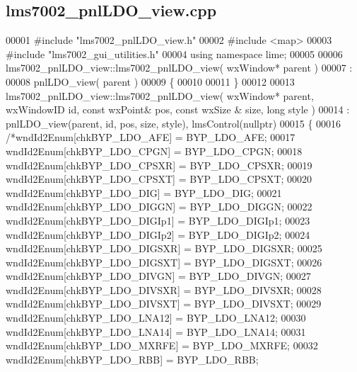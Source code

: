 \subsection{lms7002\+\_\+pnl\+L\+D\+O\+\_\+view.\+cpp}
\label{lms7002__pnlLDO__view_8cpp_source}

\begin{DoxyCode}
00001 \textcolor{preprocessor}{#include "lms7002_pnlLDO_view.h"}
00002 \textcolor{preprocessor}{#include <map>}
00003 \textcolor{preprocessor}{#include "lms7002_gui_utilities.h"}
00004 \textcolor{keyword}{using namespace }lime;
00005 
00006 lms7002_pnlLDO_view::lms7002_pnlLDO_view( wxWindow* parent )
00007 :
00008 pnlLDO_view( parent )
00009 \{
00010 
00011 \}
00012 
00013 lms7002_pnlLDO_view::lms7002_pnlLDO_view( wxWindow* parent, wxWindowID \textcolor{keywordtype}{id}, \textcolor{keyword}{const} wxPoint& pos, \textcolor{keyword}{const} wxSize
      & size, \textcolor{keywordtype}{long} style )
00014     : pnlLDO_view(parent, id, pos, size, style), lmsControl(nullptr)
00015 \{
00016     \textcolor{comment}{/*wndId2Enum[chkBYP\_LDO\_AFE] = BYP\_LDO\_AFE;}
00017 \textcolor{comment}{    wndId2Enum[chkBYP\_LDO\_CPGN] = BYP\_LDO\_CPGN;}
00018 \textcolor{comment}{    wndId2Enum[chkBYP\_LDO\_CPSXR] = BYP\_LDO\_CPSXR;}
00019 \textcolor{comment}{    wndId2Enum[chkBYP\_LDO\_CPSXT] = BYP\_LDO\_CPSXT;}
00020 \textcolor{comment}{    wndId2Enum[chkBYP\_LDO\_DIG] = BYP\_LDO\_DIG;}
00021 \textcolor{comment}{    wndId2Enum[chkBYP\_LDO\_DIGGN] = BYP\_LDO\_DIGGN;}
00022 \textcolor{comment}{    wndId2Enum[chkBYP\_LDO\_DIGIp1] = BYP\_LDO\_DIGIp1;}
00023 \textcolor{comment}{    wndId2Enum[chkBYP\_LDO\_DIGIp2] = BYP\_LDO\_DIGIp2;}
00024 \textcolor{comment}{    wndId2Enum[chkBYP\_LDO\_DIGSXR] = BYP\_LDO\_DIGSXR;}
00025 \textcolor{comment}{    wndId2Enum[chkBYP\_LDO\_DIGSXT] = BYP\_LDO\_DIGSXT;}
00026 \textcolor{comment}{    wndId2Enum[chkBYP\_LDO\_DIVGN] = BYP\_LDO\_DIVGN;}
00027 \textcolor{comment}{    wndId2Enum[chkBYP\_LDO\_DIVSXR] = BYP\_LDO\_DIVSXR;}
00028 \textcolor{comment}{    wndId2Enum[chkBYP\_LDO\_DIVSXT] = BYP\_LDO\_DIVSXT;}
00029 \textcolor{comment}{    wndId2Enum[chkBYP\_LDO\_LNA12] = BYP\_LDO\_LNA12;}
00030 \textcolor{comment}{    wndId2Enum[chkBYP\_LDO\_LNA14] = BYP\_LDO\_LNA14;}
00031 \textcolor{comment}{    wndId2Enum[chkBYP\_LDO\_MXRFE] = BYP\_LDO\_MXRFE;}
00032 \textcolor{comment}{    wndId2Enum[chkBYP\_LDO\_RBB] = BYP\_LDO\_RBB;}

\end{DoxyCode}
